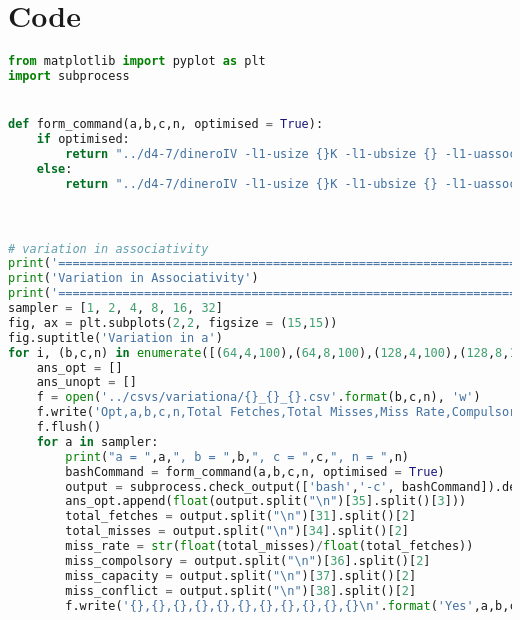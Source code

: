 \documentclass[12pt, a4paper]{article}
\begin{document}
\vspace*{-12pt}
\section*{Code}
\begin{lstlisting}[language=Python]
from matplotlib import pyplot as plt
import subprocess


def form_command(a,b,c,n, optimised = True):
 	if optimised:
 		return "../d4-7/dineroIV -l1-usize {}K -l1-ubsize {} -l1-uassoc {} -l1-uwalloc a -l1-uwback a -l1-uccc  -informat d < ../trace_files/optimised/nopt{}.din".format(c,b,a,n)
 	else:
 		return "../d4-7/dineroIV -l1-usize {}K -l1-ubsize {} -l1-uassoc {} -l1-uwalloc a -l1-uwback a -l1-uccc  -informat d < ../trace_files/unoptimised/n{}.din".format(c,b,a,n)



# variation in associativity
print('==============================================================================')
print('Variation in Associativity')
print('==============================================================================')
sampler = [1, 2, 4, 8, 16, 32]
fig, ax = plt.subplots(2,2, figsize = (15,15))
fig.suptitle('Variation in a')
for i, (b,c,n) in enumerate([(64,4,100),(64,8,100),(128,4,100),(128,8,100)]):
	ans_opt = []
	ans_unopt = []
	f = open('../csvs/variationa/{}_{}_{}.csv'.format(b,c,n), 'w')
	f.write('Opt,a,b,c,n,Total Fetches,Total Misses,Miss Rate,Compulsory miss, Conflict miss, Capacity miss\n')
	f.flush()
	for a in sampler:
		print("a = ",a,", b = ",b,", c = ",c,", n = ",n)
		bashCommand = form_command(a,b,c,n, optimised = True)
		output = subprocess.check_output(['bash','-c', bashCommand]).decode('utf8')
		ans_opt.append(float(output.split("\n")[35].split()[3]))
		total_fetches = output.split("\n")[31].split()[2]
		total_misses = output.split("\n")[34].split()[2]
		miss_rate = str(float(total_misses)/float(total_fetches))
		miss_compolsory = output.split("\n")[36].split()[2]
		miss_capacity = output.split("\n")[37].split()[2]
		miss_conflict = output.split("\n")[38].split()[2]
		f.write('{},{},{},{},{},{},{},{},{},{},{}\n'.format('Yes',a,b,c,n,total_fetches,total_misses,miss_rate,miss_compolsory,miss_conflict,miss_capacity))


\end{lstlisting}
\end{document}
